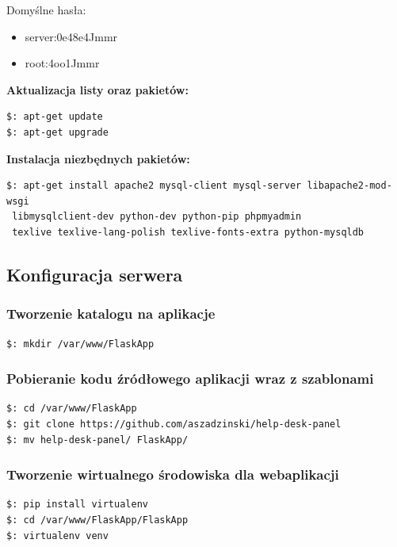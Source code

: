 \documentclass[12pt,a4paper]{article}
\begin{document}
Domyślne hasła:
\begin{itemize}
\item server:0e48e4Jmmr
\item root:4oo1Jmmr
\end{itemize}

\textbf{Aktualizacja listy oraz pakietów:}
\begin{lstlisting}
$: apt-get update
$: apt-get upgrade
\end{lstlisting}

\textbf{Instalacja niezbędnych pakietów:}
\begin{lstlisting}
$: apt-get install apache2 mysql-client mysql-server libapache2-mod-wsgi
 libmysqlclient-dev python-dev python-pip phpmyadmin 
 texlive texlive-lang-polish texlive-fonts-extra python-mysqldb
\end{lstlisting}

\subsection{Konfiguracja serwera}

\subsubsection{Tworzenie katalogu na aplikacje}
\begin{lstlisting}
$: mkdir /var/www/FlaskApp
\end{lstlisting}
\subsubsection{Pobieranie kodu źródłowego aplikacji wraz z szablonami}
\begin{lstlisting}
$: cd /var/www/FlaskApp
$: git clone https://github.com/aszadzinski/help-desk-panel
$: mv help-desk-panel/ FlaskApp/
\end{lstlisting}
\subsubsection{Tworzenie wirtualnego środowiska dla webaplikacji}
\begin{lstlisting}
$: pip install virtualenv
$: cd /var/www/FlaskApp/FlaskApp
$: virtualenv venv
\end{lstlisting}
\newpage
\end{document}
